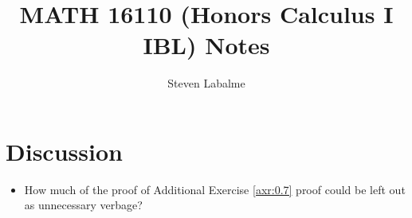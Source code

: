 \documentclass[titlepage]{report}
\title{MATH 16110 (Honors Calculus I IBL) Notes}
\author{Steven Labalme}
\begin{document}
\maketitle



\tableofcontents
\listoffigures
\newpage



\pagestyle{main}
\renewcommand{\chaptermark}[1]{\markboth{#1}{}}
\setcounter{secnumdepth}{0}




\renewcommand{\chaptermark}[1]{\markboth{\chaptername\ \thechapter}{}}
\setcounter{secnumdepth}{3}
\setcounter{chapter}{-1}



\section{Discussion}
\begin{itemize}
    \item {}How much of the proof of Additional Exercise \ref{axr:0.7} proof could be left out as unnecessary verbage?
\end{itemize}




\end{document}
